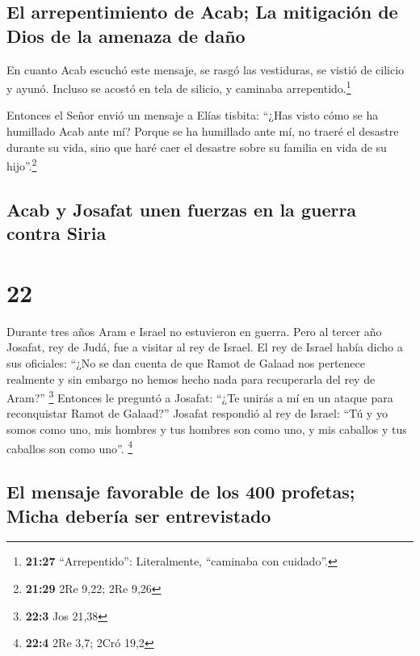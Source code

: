 \hypertarget{el-arrepentimiento-de-acab-la-mitigaciuxf3n-de-dios-de-la-amenaza-de-dauxf1o}{%
\subsection{El arrepentimiento de Acab; La mitigación de Dios de la
amenaza de
daño}\label{el-arrepentimiento-de-acab-la-mitigaciuxf3n-de-dios-de-la-amenaza-de-dauxf1o}}

 En cuanto Acab escuchó este mensaje, se rasgó las
vestiduras, se vistió de cilicio y ayunó. Incluso se acostó en tela de
silicio, y caminaba arrepentido.\footnote{\textbf{21:27}
  ``Arrepentido'': Literalmente, ``caminaba con cuidado''.}

 Entonces el Señor envió un mensaje a Elías tisbita:
 ``¿Has visto cómo se ha humillado Acab ante mí? Porque
se ha humillado ante mí, no traeré el desastre durante su vida, sino que
haré caer el desastre sobre su familia en vida de su hijo''.\footnote{\textbf{21:29}
  2Re 9,22; 2Re 9,26}

\hypertarget{acab-y-josafat-unen-fuerzas-en-la-guerra-contra-siria}{%
\subsection{Acab y Josafat unen fuerzas en la guerra contra
Siria}\label{acab-y-josafat-unen-fuerzas-en-la-guerra-contra-siria}}

\hypertarget{section-21}{%
\section{22}\label{section-21}}

 Durante tres años Aram e Israel no estuvieron en guerra.
 Pero al tercer año Josafat, rey de Judá, fue a visitar al
rey de Israel.  El rey de Israel había dicho a sus
oficiales: ``¿No se dan cuenta de que Ramot de Galaad nos pertenece
realmente y sin embargo no hemos hecho nada para recuperarla del rey de
Aram?'' \footnote{\textbf{22:3} Jos 21,38}  Entonces le
preguntó a Josafat: ``¿Te unirás a mí en un ataque para reconquistar
Ramot de Galaad?'' Josafat respondió al rey de Israel: ``Tú y yo somos
como uno, mis hombres y tus hombres son como uno, y mis caballos y tus
caballos son como uno''. \footnote{\textbf{22:4} 2Re 3,7; 2Cró 19,2}

\hypertarget{el-mensaje-favorable-de-los-400-profetas-micha-deberuxeda-ser-entrevistado}{%
\subsection{El mensaje favorable de los 400 profetas; Micha debería ser
entrevistado}\label{el-mensaje-favorable-de-los-400-profetas-micha-deberuxeda-ser-entrevistado}}

